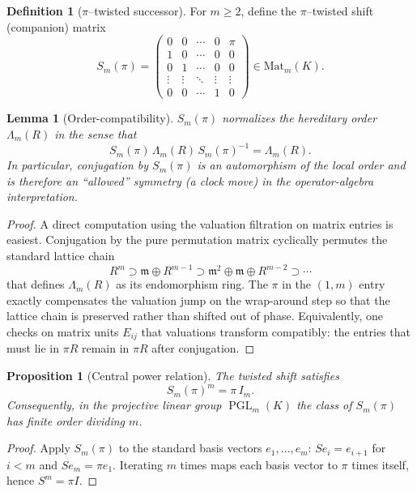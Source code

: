 \documentclass[11pt,oneside]{amsbook}
\numberwithin{equation}{section}
\theoremstyle{plain}
\newtheorem{proposition}[theorem]{Proposition}
\newtheorem{lemma}[theorem]{Lemma}
\theoremstyle{definition}
\newtheorem{definition}[theorem]{Definition}
\theoremstyle{remark}
\DeclareMathOperator{\PGL}{\mathrm{PGL}}
\begin{document}
\begin{definition}[$\pi$--twisted successor]
For $m\ge 2$, define the $\pi$--twisted shift (companion) matrix
\begin{equation}
\label{eq:twisted_shift_def}
S_m(\pi)=
\begin{pmatrix}
0 & 0 & \cdots & 0 & \pi\\
1 & 0 & \cdots & 0 & 0\\
0 & 1 & \cdots & 0 & 0\\
\vdots & \vdots & \ddots & \vdots & \vdots\\
0 & 0 & \cdots & 1 & 0
\end{pmatrix}\in \mathrm{Mat}_m(K).
\end{equation}
\end{definition}

\begin{lemma}[Order-compatibility]
\label{lem:twisted_shift_normalizes}
$S_m(\pi)$ normalizes the hereditary order $\Lambda_m(R)$ in the sense that
\[
S_m(\pi)\,\Lambda_m(R)\,S_m(\pi)^{-1}=\Lambda_m(R).
\]
In particular, conjugation by $S_m(\pi)$ is an automorphism of the local order and is therefore an ``allowed'' symmetry (a clock move) in the operator-algebra interpretation.
\end{lemma}

\begin{proof}
A direct computation using the valuation filtration on matrix entries is easiest.
Conjugation by the pure permutation matrix cyclically permutes the standard lattice chain
\[
R^m \supset \mathfrak m\oplus R^{m-1} \supset \mathfrak m^2\oplus \mathfrak m\oplus R^{m-2}\supset \cdots
\]
that defines $\Lambda_m(R)$ as its endomorphism ring.
The $\pi$ in the $(1,m)$ entry exactly compensates the valuation jump on the wrap-around step so that the lattice chain is preserved rather than shifted out of phase.
Equivalently, one checks on matrix units $E_{ij}$ that valuations transform compatibly: the entries that must lie in $\pi R$ remain in $\pi R$ after conjugation.
\end{proof}

\begin{proposition}[Central power relation]
\label{prop:twisted_shift_power}
The twisted shift satisfies
\[
S_m(\pi)^m = \pi\, I_m.
\]
Consequently, in the projective linear group $\PGL_m(K)$ the class of $S_m(\pi)$ has \emph{finite order} dividing $m$.
\end{proposition}

\begin{proof}
Apply $S_m(\pi)$ to the standard basis vectors $e_1,\dots,e_m$:
$S e_i=e_{i+1}$ for $i<m$ and $S e_m=\pi e_1$.
Iterating $m$ times maps each basis vector to $\pi$ times itself, hence $S^m=\pi I$.
\end{proof}
\end{document}
